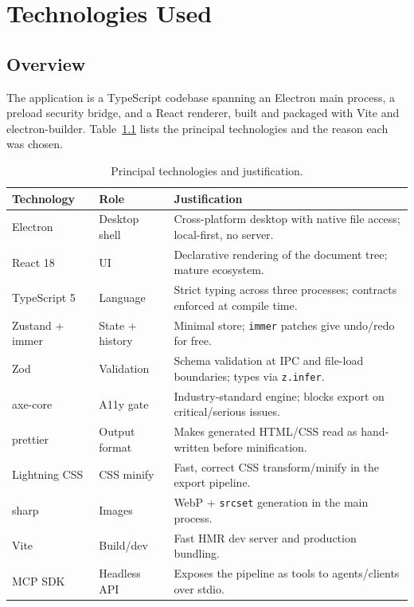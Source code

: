 
\chapter{Technologies Used}
\label{ch:tech}

\section{Overview}
The application is a TypeScript codebase spanning an Electron main process, a
preload security bridge, and a React renderer, built and packaged with Vite and
electron-builder. Table~\ref{tab:tech} lists the principal technologies and the
reason each was chosen.

\begin{table}[H]
  \centering
  \caption{Principal technologies and justification.}
  \label{tab:tech}
  \small
  \begin{tabularx}{\linewidth}{@{}l l X@{}}
    \toprule
    \textbf{Technology} & \textbf{Role} & \textbf{Justification} \\
    \midrule
    Electron \cite{electron} & Desktop shell & Cross-platform desktop with native file access; local-first, no server. \\
    React 18 \cite{react} & UI & Declarative rendering of the document tree; mature ecosystem. \\
    TypeScript 5 \cite{typescript} & Language & Strict typing across three processes; contracts enforced at compile time. \\
    Zustand + immer \cite{zustand,immer} & State + history & Minimal store; \texttt{immer} patches give undo/redo for free. \\
    Zod \cite{zod} & Validation & Schema validation at IPC and file-load boundaries; types via \texttt{z.infer}. \\
    axe-core \cite{axecore} & A11y gate & Industry-standard engine; blocks export on critical/serious issues. \\
    prettier \cite{prettier} & Output format & Makes generated HTML/CSS read as hand-written before minification. \\
    Lightning CSS \cite{lightningcss} & CSS minify & Fast, correct CSS transform/minify in the export pipeline. \\
    sharp \cite{sharp} & Images & WebP + \texttt{srcset} generation in the main process. \\
    Vite \cite{vite} & Build/dev & Fast HMR dev server and production bundling. \\
    MCP SDK \cite{mcp-spec} & Headless API & Exposes the pipeline as tools to agents/clients over stdio. \\
    \bottomrule
  \end{tabularx}
\end{table}

